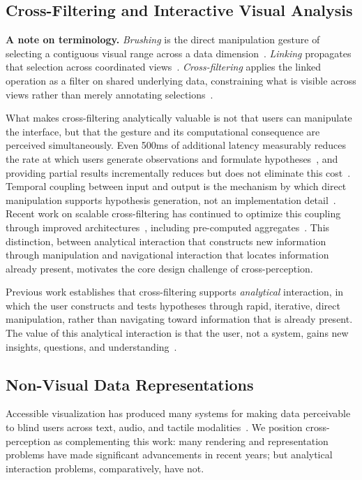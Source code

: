 \documentclass[12pt]{cmuthesis}
\begin{document}
\subsection{Cross-Filtering and Interactive Visual Analysis} 

\textbf{A note on terminology.} \textit{Brushing} is the direct manipulation gesture of selecting a contiguous visual range across a data dimension~\cite{Becker1987}. \textit{Linking} propagates that selection across coordinated views~\cite{buja1991interactive}. \textit{Cross-filtering} applies the linked operation as a filter on shared underlying data, constraining what is visible across views rather than merely annotating selections~\cite{ahlberg1994visual, Weaver2008}.

What makes cross-filtering analytically valuable is not that users can manipulate the interface, but that the gesture and its computational consequence are perceived simultaneously. Even 500ms of additional latency measurably reduces the rate at which users generate observations and formulate hypotheses~\cite{Liu2014}, and providing partial results incrementally reduces but does not eliminate this cost~\cite{Fisher2012}. Temporal coupling between input and output is the mechanism by which direct manipulation supports hypothesis generation, not an implementation detail~\cite{Heer2007}. Recent work on scalable cross-filtering has continued to optimize this coupling through improved architectures~\cite{heer_mosaic_2023}, including pre-computed aggregates~\cite{Moritz2019}. This distinction, between analytical interaction that constructs new information through manipulation and navigational interaction that locates information already present, motivates the core design challenge of cross-perception.

Previous work establishes that cross-filtering supports \textit{analytical} interaction, in which the user constructs and tests hypotheses through rapid, iterative, direct manipulation, rather than navigating toward information that is already present. The value of this analytical interaction is that the user, not a system, gains new insights, questions, and understanding~\cite{Shneiderman1992}.


\subsection{Non-Visual Data Representations} 

Accessible visualization has produced many systems for making data perceivable to blind users across text, audio, and tactile modalities~\cite{Lundgard2022Accessible, Jung2022Communicating, Kim2024, Engel2017, Race2023, sun2025tactile, Gorlewicz2020}. We position cross-perception as complementing this work: many rendering and representation problems have made significant advancements in recent years; but analytical interaction problems, comparatively, have not. 
\end{document}
